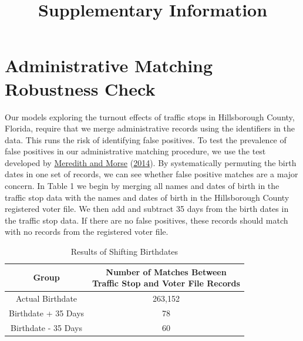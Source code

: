 \documentclass[
  12pt,
]{article}
\title{Supplementary Information}
\author{}
\date{\vspace{-2.5em}}
\begin{document}
\maketitle

{
\setcounter{tocdepth}{2}
\tableofcontents
}
\doublespacing
\newpage

\hypertarget{administrative-matching-robustness-check}{%
\section{Administrative Matching Robustness Check}\label{administrative-matching-robustness-check}}

Our models exploring the turnout effects of traffic stops in Hillsborough County, Florida, require that we merge administrative records using the identifiers in the data. This runs the risk of identifying false positives. To test the prevalence of false positives in our administrative matching procedure, we use the test developed by \protect\hyperlink{ref-Meredith2014}{Meredith and Morse} (\protect\hyperlink{ref-Meredith2014}{2014}). By systematically permuting the birth dates in one set of records, we can see whether false positive matches are a major concern. In Table 1 we begin by merging all names and dates of birth in the traffic stop data with the names and dates of birth in the Hillsborough County registered voter file. We then add and subtract 35 days from the birth dates in the traffic stop data. If there are no false positives, these records should match with no records from the registered voter file.

\begin{singlespace}
\begin{table}[H]

\caption{\label{tab:shift-dobs-chunk}\label{tab:change-dobs} Results of Shifting Birthdates}
\centering
\begin{tabular}[t]{cc}
\toprule
Group & \makecell[c]{Number of Matches Between\\Traffic Stop and Voter File Records}\\
\midrule
Actual Birthdate & 263,152\\
Birthdate + 35 Days & 78\\
Birthdate - 35 Days & 60\\
\bottomrule
\end{tabular}
\end{table}
\end{singlespace}
\end{document}
